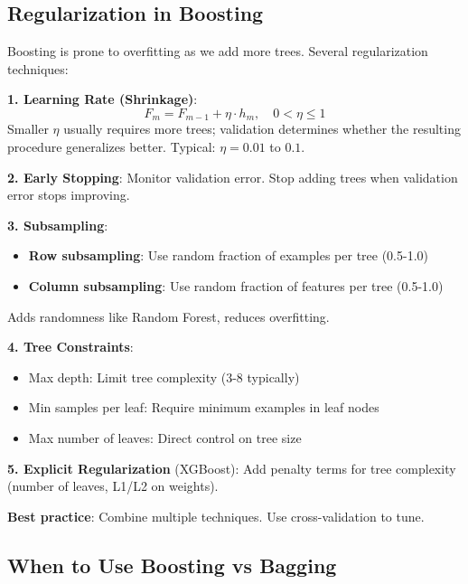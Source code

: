 \documentclass[11pt,twoside]{article}
\numberwithin{equation}{section}
\theoremstyle{plain}
\theoremstyle{definition}
\theoremstyle{remark}
\newenvironment{keyidea}{
  \begin{tcolorbox}[colback=yellow!5!white,
                    colframe=yellow!50!black,
                    title=Key Idea,
                    breakable,
                    enhanced,
                    sharp corners,
                    boxrule=0.8pt,
                    left=6pt, right=6pt, top=6pt, bottom=6pt]
}{
  \end{tcolorbox}
}
\begin{document}
\subsection{Regularization in Boosting}

\begin{keyidea}
Boosting is prone to overfitting as we add more trees. Several regularization techniques:

\textbf{1. Learning Rate (Shrinkage)}:
\[
F_m = F_{m-1} + \eta \cdot h_m, \quad 0 < \eta \leq 1
\]
Smaller $\eta$ usually requires more trees; validation determines whether the resulting procedure generalizes better. Typical: $\eta = 0.01$ to $0.1$.

\textbf{2. Early Stopping}:
Monitor validation error. Stop adding trees when validation error stops improving.

\textbf{3. Subsampling}:
\begin{itemize}
\item \textbf{Row subsampling}: Use random fraction of examples per tree (0.5-1.0)
\item \textbf{Column subsampling}: Use random fraction of features per tree (0.5-1.0)
\end{itemize}
Adds randomness like Random Forest, reduces overfitting.

\textbf{4. Tree Constraints}:
\begin{itemize}
\item Max depth: Limit tree complexity (3-8 typically)
\item Min samples per leaf: Require minimum examples in leaf nodes
\item Max number of leaves: Direct control on tree size
\end{itemize}

\textbf{5. Explicit Regularization} (XGBoost):
Add penalty terms for tree complexity (number of leaves, L1/L2 on weights).

\textbf{Best practice}: Combine multiple techniques. Use cross-validation to tune.
\end{keyidea}

\subsection{When to Use Boosting vs Bagging}
\end{document}
